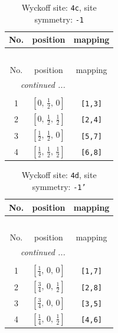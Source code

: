 \documentclass[fleqn,8pt]{jsarticle}
\begin{document}
\renewcommand{\arraystretch}{1.2}
\begin{longtable}{ccc}
\caption{Wyckoff site: {\tt 4c}, site symmetry: {\tt -1}}
 \\
 \hline \hline
No. & position & mapping \\ \hline \endfirsthead

\multicolumn{2}{l}{\tablename\ \thetable{}} \\
 \hline \hline
No. & position & mapping \\ \hline \endhead

 \hline \hline
\multicolumn{2}{r}{\footnotesize\it continued ...} \\ \endfoot

 \hline \hline
\multicolumn{2}{r}{} \\ \endlastfoot

1 & $\left[ 0,\, \frac{1}{2},\, 0 \right]$ & {\tt [1,3]} \\ \hline
2 & $\left[ 0,\, \frac{1}{2},\, \frac{1}{2} \right]$ & {\tt [2,4]} \\ \hline
3 & $\left[ \frac{1}{2},\, \frac{1}{2},\, 0 \right]$ & {\tt [5,7]} \\ \hline
4 & $\left[ \frac{1}{2},\, \frac{1}{2},\, \frac{1}{2} \right]$ & {\tt [6,8]} \\
\end{longtable}
\renewcommand{\arraystretch}{1.2}
\begin{longtable}{ccc}
\caption{Wyckoff site: {\tt 4d}, site symmetry: {\tt -1'}}
 \\
 \hline \hline
No. & position & mapping \\ \hline \endfirsthead

\multicolumn{2}{l}{\tablename\ \thetable{}} \\
 \hline \hline
No. & position & mapping \\ \hline \endhead

 \hline \hline
\multicolumn{2}{r}{\footnotesize\it continued ...} \\ \endfoot

 \hline \hline
\multicolumn{2}{r}{} \\ \endlastfoot

1 & $\left[ \frac{1}{4},\, 0,\, 0 \right]$ & {\tt [1,7]} \\ \hline
2 & $\left[ \frac{3}{4},\, 0,\, \frac{1}{2} \right]$ & {\tt [2,8]} \\ \hline
3 & $\left[ \frac{3}{4},\, 0,\, 0 \right]$ & {\tt [3,5]} \\ \hline
4 & $\left[ \frac{1}{4},\, 0,\, \frac{1}{2} \right]$ & {\tt [4,6]} \\
\end{longtable}
\end{document}
